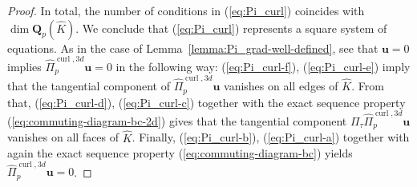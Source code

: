 \documentclass{article}
\newcommand{\hatPicurlcom}{\widehat \Pi^{\operatorname*{curl},3d}_p}
\begin{document}
\begin{proof}
In total, the number of conditions in (\ref{eq:Pi_curl}) coincides with
$\operatorname*{dim}\mathbf{Q}_{p}(\widehat{K})$. We conclude that (\ref{eq:Pi_curl}) represents a  
square system of equations. As in the case of Lemma~\ref{lemma:Pi_grad-well-defined}, 
see that ${\mathbf u} = 0$ implies $\hatPicurlcom {\mathbf u} = 0$ in the following way: 
(\ref{eq:Pi_curl-f}), (\ref{eq:Pi_curl-e}) imply that the tangential component of 
$\hatPicurlcom {\mathbf u}$ vanishes on all edges of $\widehat K$. From that, 
(\ref{eq:Pi_curl-d}), (\ref{eq:Pi_curl-c}) together with the exact sequence property 
(\ref{eq:commuting-diagram-bc-2d}) gives that the tangential component 
$\Pi_\tau \hatPicurlcom {\mathbf u}$ vanishes on all faces of $\widehat K$. Finally, 
(\ref{eq:Pi_curl-b}), (\ref{eq:Pi_curl-a}) together with again the exact sequence property 
(\ref{eq:commuting-diagram-bc}) yields $\hatPicurlcom {\mathbf u} = 0$. 
\end{proof}
\end{document}

